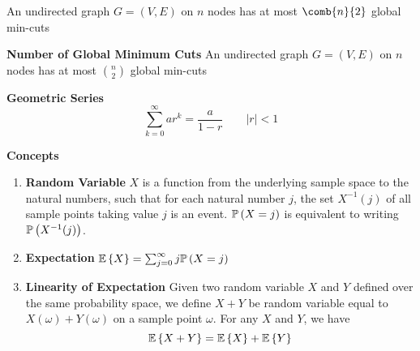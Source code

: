 \documentclass[11pt]{article}
\begin{document}
\begin{theorem*}
    An undirected graph $G = (V,E)$ on $n$ nodes has at most $\comb{n}{2}$ global min-cuts
\end{theorem*}

\begin{defn*}
    \textbf{Number of Global Minimum Cuts} An undirected graph $G = (V,E)$ on $n$ nodes has at most $\binom{n}{2}$ global min-cuts
\end{defn*}




\begin{defn*}
    \textbf{Geometric Series} 
    \[
        \sum_{k=0}^{\infty}ar^k = \frac{a}{1-r} \qquad |r| < 1    
    \]
\end{defn*}

\begin{defn*}
    \textbf{Concepts}
    \begin{enumerate}
        \item \textbf{Random Variable} $X$ is a function from the underlying sample space to the natural numbers, such that for each natural number $j$, the set $X^{-1}(j)$ of all sample points taking value $j$ is an event. $\mathbb{P}\left( X=j \right)$ is equivalent to writing $\mathbb{P}\left( X^{-1}(j) \right)$. 
        \item \textbf{Expectation} $\mathbb{E}\left\{ X \right\} = \sum_{j=0}^{\infty} j \mathbb{P}\left( X=j \right)$
        \item \textbf{Linearity of Expectation} Given two random variable $X$ and $Y$ defined over the same probability space, we define $X+Y$ be random variable equal to $X(\omega) + Y(\omega)$ on a sample point $\omega$. For any $X$ and $Y$, we have 
        \[
            \mathbb{E}\left\{ X+Y \right\} = \mathbb{E}\left\{ X \right\} + \mathbb{E}\left\{ Y \right\}    
        \]
    \end{enumerate}
\end{defn*}

\end{document}
